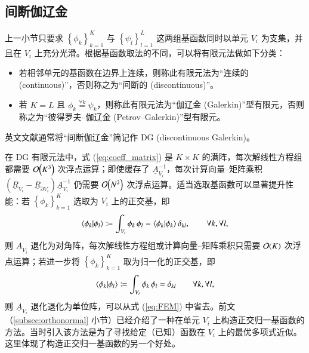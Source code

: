 \subsection{间断伽辽金}

上一小节只要求 $\left\{ \phi_{k}\right\} _{k=1}^{K}$ 与 $\left\{ \psi_{l}\right\} _{l=1}^{L}$
这两组基函数同时以单元 $V_{i}$ 为支集，并且在 $V_{i}$ 上充分光滑。根据基函数取法的不同，可以将有限元法做如下分类：
\begin{itemize}
\item 若相邻单元的基函数在边界上连续，则称此有限元法为“连续的 (continuous)”，否则称之为“间断的 (discontinuous)”。
\item 若 $K=L$ 且 $\phi_{k}\stackrel{\forall k}{=}\psi_{k}$，则称此有限元法为“伽辽金
(Galerkin)”型有限元，否则称之为“彼得罗夫–伽辽金 (Petrov–Galerkin)”型有限元。
\end{itemize}
英文文献通常将“间断伽辽金”简记作 DG
(discontinuous Galerkin)。

在 DG 有限元法中，式 (\ref{eq:coeff_matrix}) 是 $K\times K$ 的满阵，每次解线性方程组都需要
$\order{K^{3}}$ 次浮点运算；即使缓存了 $\underline{A}_{V_{i}}^{-1}$，每次计算向量–矩阵乘积
$\left(\underline{R}_{V_{i}}-\underline{R}_{\partial V_{i}}\right)\underline{A}_{V_{i}}^{-1}$
仍需要 $\order{N^{2}}$ 次浮点运算。适当选取基函数可以显著提升性能：若 $\left\{ \phi_{k}\right\} _{k=1}^{K}$
选取为 $V_{i}$ 上的正交基，即
\begin{equation}
\ip{\phi_{k}}{\phi_{l}}\coloneqq\int_{V_{i}}\phi_{k}\,\phi_{l}=\ip{\phi_{k}}{\phi_{k}}\delta_{kl},\qquad\forall k,\forall l,
\end{equation}
则 $\underline{A}_{V_{i}}$ 退化为对角阵，每次解线性方程组或计算向量–矩阵乘积只需要 $\order{K}$
次浮点运算；若进一步将 $\left\{ \phi_{k}\right\} _{k=1}^{K}$ 取为归一化的正交基，即
\begin{equation}
\ip{\phi_{k}}{\phi_{l}}\coloneqq\int_{V_{i}}\phi_{k}\,\phi_{l}=\delta_{kl}\qquad\forall k,\forall l,
\end{equation}
则 $\underline{A}_{V_{i}}$ 退化退化为单位阵，可以从式 (\ref{eq:FEM}) 中省去。前文（\ref{subsec:orthonormal}
小节）已经介绍了一种在单元 $V_{i}$ 上构造正交归一基函数的方法。当时引入该方法是为了寻找给定（已知）函数在 $V_{i}$
上的最优多项式近似。这里体现了构造正交归一基函数的另一个好处。

